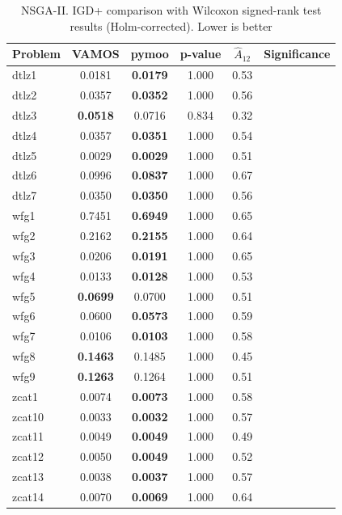\documentclass[journal]{IEEEtran}
\newcommand{\xmark}{\ding{55}}
\begin{document}
\begin{table}[htbp]
\centering
\caption{NSGA-II. IGD+ comparison with Wilcoxon signed-rank test results (Holm-corrected). Lower is better}
\label{tab:stats_igd_plus_nsgaii}
\begin{tabular}{lccccc}
\toprule
\textbf{Problem} & \textbf{VAMOS} & \textbf{pymoo} & \textbf{p-value} & \textbf{$\hat{A}_{12}$} & \textbf{Significance} \\
\midrule
dtlz1 & 0.0181 & \textbf{0.0179} & 1.000 & 0.53 &  \xmark \\
dtlz2 & 0.0357 & \textbf{0.0352} & 1.000 & 0.56 &  \xmark \\
dtlz3 & \textbf{0.0518} & 0.0716 & 0.834 & 0.32 &  \xmark \\
dtlz4 & 0.0357 & \textbf{0.0351} & 1.000 & 0.54 &  \xmark \\
dtlz5 & 0.0029 & \textbf{0.0029} & 1.000 & 0.51 &  \xmark \\
dtlz6 & 0.0996 & \textbf{0.0837} & 1.000 & 0.67 &  \xmark \\
dtlz7 & 0.0350 & \textbf{0.0350} & 1.000 & 0.56 &  \xmark \\
wfg1 & 0.7451 & \textbf{0.6949} & 1.000 & 0.65 &  \xmark \\
wfg2 & 0.2162 & \textbf{0.2155} & 1.000 & 0.64 &  \xmark \\
wfg3 & 0.0206 & \textbf{0.0191} & 1.000 & 0.65 &  \xmark \\
wfg4 & 0.0133 & \textbf{0.0128} & 1.000 & 0.53 &  \xmark \\
wfg5 & \textbf{0.0699} & 0.0700 & 1.000 & 0.51 &  \xmark \\
wfg6 & 0.0600 & \textbf{0.0573} & 1.000 & 0.59 &  \xmark \\
wfg7 & 0.0106 & \textbf{0.0103} & 1.000 & 0.58 &  \xmark \\
wfg8 & \textbf{0.1463} & 0.1485 & 1.000 & 0.45 &  \xmark \\
wfg9 & \textbf{0.1263} & 0.1264 & 1.000 & 0.51 &  \xmark \\
zcat1 & 0.0074 & \textbf{0.0073} & 1.000 & 0.58 &  \xmark \\
zcat10 & 0.0033 & \textbf{0.0032} & 1.000 & 0.57 &  \xmark \\
zcat11 & 0.0049 & \textbf{0.0049} & 1.000 & 0.49 &  \xmark \\
zcat12 & 0.0050 & \textbf{0.0049} & 1.000 & 0.52 &  \xmark \\
zcat13 & 0.0038 & \textbf{0.0037} & 1.000 & 0.57 &  \xmark \\
zcat14 & 0.0070 & \textbf{0.0069} & 1.000 & 0.64 &  \xmark \\

\end{tabular}
\end{table}
\end{document}
